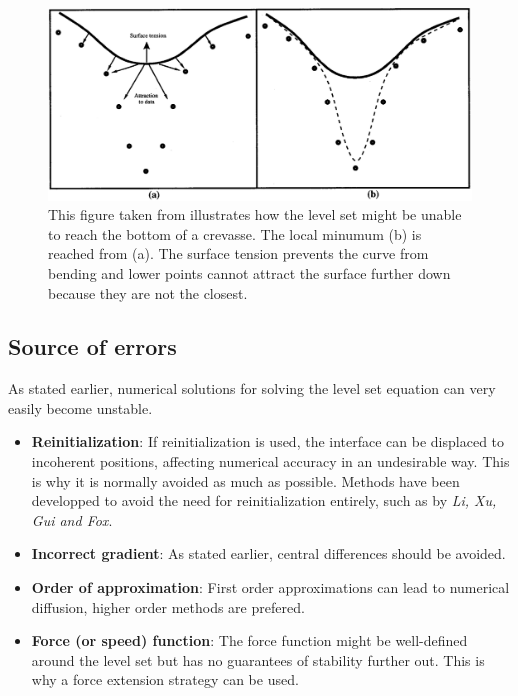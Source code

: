 \documentclass{article}
\begin{document}
\begin{figure}[H]
  \centering
  \includegraphics[width=1.0\textwidth]{img/savadjiev3_3.png}
  \caption{This figure taken from \cite{savadjiev2003surface} illustrates
  how the level set might be unable to reach the bottom of a crevasse. The local
  minumum (b) is reached from (a). The surface tension prevents the curve from
  bending and lower points cannot attract the surface further down because they
  are not the closest.}    
\end{figure}

\subsection{Source of errors}
As stated earlier, numerical solutions for solving the level set equation can
very easily become unstable.
\begin{itemize}
    \item \textbf{Reinitialization}: If reinitialization is used, the interface
        can be displaced to incoherent positions, affecting numerical accuracy
        in an undesirable way. This is why it is normally avoided as much as
        possible. Methods have been developped to avoid the need for
        reinitialization entirely, such as \cite{li2010distance} by \emph{Li,
        Xu, Gui and Fox}.
    \item \textbf{Incorrect gradient}: As stated earlier, central differences
        should be avoided.
    \item \textbf{Order of approximation}: First order approximations can lead
        to numerical diffusion, higher order methods are prefered.
    \item \textbf{Force (or speed) function}: The force function might be
        well-defined around the level set but has no guarantees of stability
        further out. This is why a force extension strategy can be used. 
\end{itemize}



\end{document}
